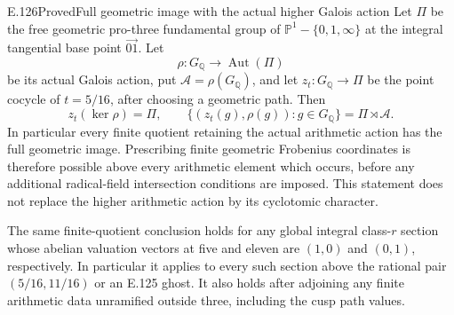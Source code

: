 \begin{result}{E.126}{Proved}{Full geometric image with the actual higher Galois action}
Let $\Pi$ be the free geometric pro-three fundamental
group of $\mathbb P^1-\{0,1,\infty\}$ at the integral
tangential base point $\overrightarrow{01}$. Let
\[
 \rho:G_{\mathbb Q}\longrightarrow\operatorname{Aut}(\Pi)
\]
be its actual Galois action, put $\mathcal A=\rho(G_{\mathbb Q})$,
and let $z_t:G_{\mathbb Q}\to\Pi$ be the point cocycle of
$t=5/16$, after choosing a geometric path. Then
\[
 z_t(\ker\rho)=\Pi,
 \qquad
 \{(z_t(g),\rho(g)):g\in G_{\mathbb Q}\}
                  =\Pi\rtimes\mathcal A.
 \tag{E.126.1}
\]
In particular every finite quotient retaining the actual
arithmetic action has the full geometric image. Prescribing
finite geometric Frobenius coordinates is therefore possible
above every arithmetic element which occurs, before any
additional radical-field intersection conditions are imposed.
This statement does not replace the higher arithmetic action
by its cyclotomic character.

The same finite-quotient conclusion holds for any global
integral class-$r$ section whose abelian valuation vectors
at five and eleven are $(1,0)$ and $(0,1)$, respectively.
In particular it applies to every such section above the
rational pair $(5/16,11/16)$ or an E.125 ghost. It also
holds after adjoining any finite arithmetic data
unramified outside three, including the cusp path values.
\end{result}
